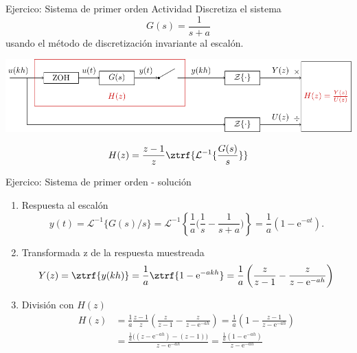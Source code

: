 \documentclass[presentation,aspectratio=169]{beamer}
\begin{document}
\begin{frame}[label={sec:orga0f2b6d}]{Ejercico: Sistema de primer orden}
\alert{Actividad} Discretiza el sistema 
\[ G(s) = \frac{1}{s + a} \]
usando el método de discretización invariante al escalón.
\begin{center}
\includegraphics[width=0.69\linewidth]{../../figures/invariant-sampling.pdf}
\end{center}

\begin{tcolorbox}
\[ H(z) = \frac{z-1}{z} \ztrf{\mathcal{L}^{-1}\{ \frac{G(s)}{s} \}} \]
\end{tcolorbox}
\end{frame}

\begin{frame}[label={sec:orgf2c9e99}]{Ejercico: Sistema de primer orden - solución}
\begin{enumerate}
\item Respuesta al escalón
\[y(t) = \mathcal{L}^{-1}\{G(s)/s\} = \mathcal{L}^{-1}\left\{\frac{1}{a}\big(\frac{1}{s} - \frac{1}{s+a}\big)\right\} = \frac{1}{a}(1 - \mathrm{e}^{-at}).\]
\item Transformada z de la respuesta muestreada
\[ Y(z) = \ztrf{y(kh)} = \frac{1}{a} \ztrf{1 - \mathrm{e}^{-akh}} = \frac{1}{a} \left( \frac{z}{z-1} - \frac{z}{z-\mathrm{e}^{-ah}} \right)\]
\item División con \(H(z)\)
\begin{align*}
 H(z) &=  \frac{1}{a} \frac{z-1}{z} \left( \frac{z}{z-1} - \frac{z}{z-\mathrm{e}^{-ah}} \right)
     = \frac{1}{a} \left( 1 - \frac{z-1}{z-\mathrm{e}^{-ah}}\right)\\
     &= \frac{\frac{1}{a}\big((z-\mathrm{e}^{-ah}) - (z-1)\big)}{z-\mathrm{e}^{-ah}}
      = \frac{\frac{1}{a}(1-\mathrm{e}^{-ah})}{z-\mathrm{e}^{-ah}}
\end{align*}
\end{enumerate}
\end{frame}
\end{document}
